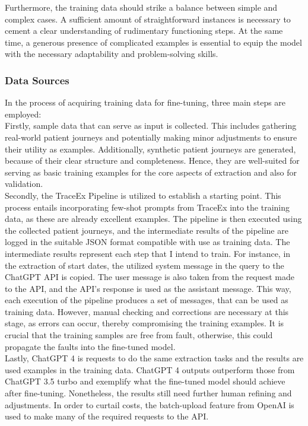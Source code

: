 Furthermore, the training data should strike a balance between simple and complex cases. A sufficient amount of straightforward instances is necessary to cement a clear understanding of rudimentary functioning steps. At the same time, a generous presence of complicated examples is essential to equip the model with the necessary adaptability and problem-solving skills. 

\subsubsection{Data Sources}
In the process of acquiring training data for fine-tuning, three main steps are employed:\\

Firstly, sample data that can serve as input is collected. This includes gathering real-world patient journeys and potentially making minor adjustments to ensure their utility as examples. Additionally, synthetic patient journeys are generated, because of their clear structure and completeness. Hence, they are well-suited for serving as basic training examples for the core aspects of extraction and also for validation.\\

Secondly, the TraceEx Pipeline is utilized to establish a starting point. This process entails incorporating few-shot prompts from TraceEx into the training data, as these are already excellent examples. The pipeline is then executed using the collected patient journeys, and the intermediate results of the pipeline are logged in the suitable JSON format compatible with use as training data. The intermediate results represent each step that I intend to train. For instance, in the extraction of start dates, the utilized system message in the query to the ChatGPT API is copied. The user message is also taken from the request made to the API, and the API's response is used as the assistant message. This way, each execution of the pipeline produces a set of messages, that can be used as training data. However, manual checking and corrections are necessary at this stage, as errors can occur, thereby compromising the training examples. It is crucial that the training samples are free from fault, otherwise, this could propagate the faults into the fine-tuned model.\\

Lastly, ChatGPT 4 is requests to do the same extraction tasks and the results are used examples in the training data. ChatGPT 4 outputs outperform those from ChatGPT 3.5 turbo and exemplify what the fine-tuned model should achieve after fine-tuning. Nonetheless, the results still need further human refining and adjustments. In order to curtail costs, the batch-upload feature from OpenAI is used to make many of the required requests to the API.